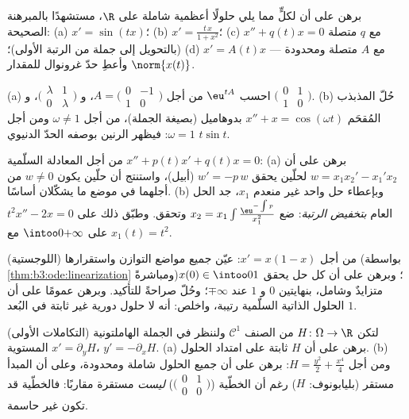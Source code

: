 \begin{exercise}[$\star\star$]\label{exo:b3:ode:3}
برهن على أن لكلٍّ مما يلي حلولًا أعظمية شاملة على $\R$، مستشهدًا
بالمبرهنة الصحيحة:
(a) $x' = \sin(tx)$؛
(b) $x' = \frac{t\,x}{1 + x^2}$؛
(c) $x'' + q(t)x = 0$ مع $q$ متصلة (بالتحويل إلى جملة من الرتبة الأولى)؛
(d) $x' = A(t)x$ مع $A$ متصلة ومحدودة --- وأعطِ حدّ غرونوال
للمقدار $\norm{x(t)}$.
\end{exercise}

\begin{exercise}[$\star\star$]\label{exo:b3:ode:4}
(a) احسب $\eu^{tA}$ من أجل
$A = \bigl(\begin{smallmatrix}0 & -1\\ 1 &
0\end{smallmatrix}\bigr)$،
و $\bigl(\begin{smallmatrix}\lambda & 1\\ 0 &
\lambda\end{smallmatrix}\bigr)$،
و $\bigl(\begin{smallmatrix}0 & 1\\ 1 &
0\end{smallmatrix}\bigr)$.
(b) حُلّ المذبذب المُقحَم $x'' + x = \cos(\omega t)$ بدوهاميل (بصيغة الجملة)، من
أجل $\omega \neq 1$ ومن أجل $\omega =
1$: فيظهر الرنين بوصفه الحدّ
الدنيوي $t\sin t$.
\end{exercise}

\begin{exercise}[$\star\star$]\label{exo:b3:ode:5}
من أجل المعادلة السلّمية $x'' + p(t)x' + q(t)x = 0$:
(a) برهن على أن  $w = x_1x_2' - x_1'x_2$ لحلّين يحقق $w' = -p\,w$
(أبيل)، واستنتج أن حلّين يكون $w \neq 0$ من أجلهما في موضع ما
يشكّلان أساسًا.
(b) وبإعطاء حل واحد غير منعدم $x_1$، جد الحل العام
\emph{بتخفيض الرتبة}: ضع $x_2 = x_1\int
\frac{\eu^{-\int p}}{x_1^2}$ وتحقق. وطبّق ذلك على $t^2x'' -
2x = 0$
على $\intoo0{+\infty}$ مع $x_1(t) = t^2$.
\end{exercise}

\begin{exercise}[$\star\star$]\label{exo:b3:ode:6}
(اللوجستية) من أجل $x' = x(1 - x)$: عيّن جميع مواضع التوازن
واستقرارها (بواسطة \cref{thm:b3:ode:linearization} ومباشرةً)؛ وبرهن على أن كل حل
يحقق $x(0) \in \intoo01$ متزايدٌ وشامل، بنهايتين $0$ و $1$ عند $\mp\infty$؛
وحُلّ صراحةً للتأكيد. وبرهن عمومًا على أن الحلول الذاتية
السلّمية رتيبة، واخلص: أنه لا حلول دورية غير ثابتة في البُعد
$1$.
\end{exercise}

\begin{exercise}[$\star\star$]\label{exo:b3:ode:7}
(التكاملات الأولى) لتكن $H \colon \Omega \to \R$ من الصنف $\mathcal
C^1$ ولننظر في
الجملة الهاملتونية المستوية $x' =
\partial_yH$، $y' = -\partial_xH$.
(a) برهن على أن $H$ ثابتة على امتداد الحلول.
(b) ومن أجل $H = \frac{y^2}2 + \frac{x^4}4$: برهن على أن جميع الحلول شاملة ومحدودة،
وعلى أن المبدأ مستقر (بليابونوف: $H$) رغم أن الخطّية ($\bigl(\begin{smallmatrix}0&1\\0&0\end{smallmatrix}\bigr)$)
\emph{ليست} مستقرة مقاربًا: فالخطّية قد تكون غير حاسمة.
\end{exercise}

